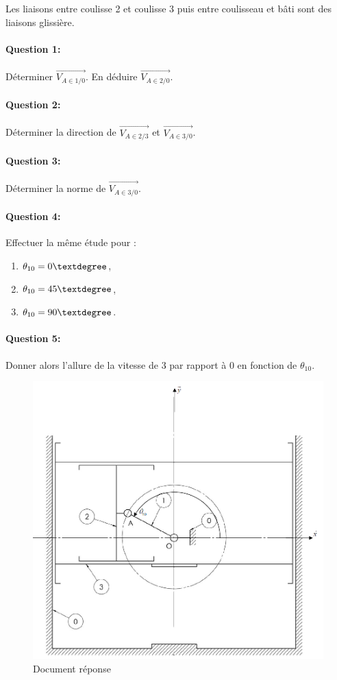 Les liaisons entre coulisse 2 et coulisse 3 puis entre coulisseau et bâti sont des liaisons glissière.

\paragraph{Question 1:} Déterminer $\overrightarrow{V_{A \in 1/0}}$. En déduire $\overrightarrow{V_{A \in 2/0}}$.

\paragraph{Question 2:} Déterminer la direction de $\overrightarrow{V_{A \in 2/3}}$ et $\overrightarrow{V_{A \in 3/0}}$.

\paragraph{Question 3:} Déterminer la norme de $\overrightarrow{V_{A \in 3/0}}$.

\paragraph{Question 4:} Effectuer la même étude pour :
\begin{enumerate}
 \item $\theta_{10} = 0\textdegree$,
 \item $\theta_{10} = 45\textdegree$,
 \item $\theta_{10} = 90\textdegree$.
\end{enumerate}

\paragraph{Question 5:} Donner alors l'allure de la vitesse de 3 par rapport à 0 en fonction de $\theta_{10}$.

\newpage

\begin{figure}[!h]
\begin{center}
\vspace{5cm}
\includegraphics[width=0.7\linewidth]{img/presse_s.png}
\vspace{6cm}
\caption{Document réponse}
\label{fig:image4}
\end{center}
\end{figure}

